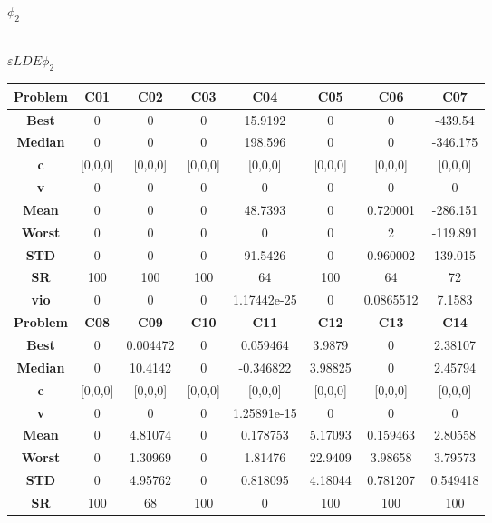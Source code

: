 \documentclass{IEEEtran}
\begin{document}
$\phi_2$\\ \\

	
\begin{center}
$\varepsilon LDE \phi_2$\\
  \begin{tabular}{|c|c|c|c|c|c|c|c|}
    \hline 
    \textbf{Problem} & \textbf{C01} & \textbf{C02} & \textbf{C03} & \textbf{C04} & \textbf{C05} & \textbf{C06} & \textbf{C07} \\ 
    \hline\hline 
    \textbf{Best} & 0 & 0 & 0 & 15.9192 & 0 & 0 & -439.54\\ 
    \textbf{Median} & 0 & 0 & 0 & 198.596 & 0 & 0 & -346.175\\ 
    \textbf{c} & [0,0,0] & [0,0,0] & [0,0,0] & [0,0,0] & [0,0,0] & [0,0,0] & [0,0,0]\\ 
    \textbf{v} & 0 & 0 & 0 & 0 & 0 & 0 & 0\\ 
    \textbf{Mean} & 0 & 0 & 0 & 48.7393 & 0 & 0.720001 & -286.151\\ 
    \textbf{Worst} & 0 & 0 & 0 & 0 & 0 & 2 & -119.891\\ 
    \textbf{STD} & 0 & 0 & 0 & 91.5426 & 0 & 0.960002 & 139.015\\ 
    \textbf{SR} & 100 & 100 & 100 & 64 & 100 & 64 & 72\\ 
    \textbf{vio} & 0 & 0 & 0 & 1.17442e-25 & 0 & 0.0865512 & 7.1583\\ 
    \hline 
    \hline 
    \textbf{Problem} & \textbf{C08} & \textbf{C09} & \textbf{C10} & \textbf{C11} & \textbf{C12} & \textbf{C13} & \textbf{C14} \\ 
    \hline\hline 
    \textbf{Best} & 0 & 0.004472 & 0 & 0.059464 & 3.9879 & 0 & 2.38107\\ 
    \textbf{Median} & 0 & 10.4142 & 0 & -0.346822 & 3.98825 & 0 & 2.45794\\ 
    \textbf{c} & [0,0,0] & [0,0,0] & [0,0,0] & [0,0,0] & [0,0,0] & [0,0,0] & [0,0,0]\\ 
    \textbf{v} & 0 & 0 & 0 & 1.25891e-15 & 0 & 0 & 0\\ 
    \textbf{Mean} & 0 & 4.81074 & 0 & 0.178753 & 5.17093 & 0.159463 & 2.80558\\ 
    \textbf{Worst} & 0 & 1.30969 & 0 & 1.81476 & 22.9409 & 3.98658 & 3.79573\\ 
    \textbf{STD} & 0 & 4.95762 & 0 & 0.818095 & 4.18044 & 0.781207 & 0.549418\\ 
    \textbf{SR} & 100 & 68 & 100 & 0 & 100 & 100 & 100\\ 

\end{tabular}
\end{center}
\end{document}
